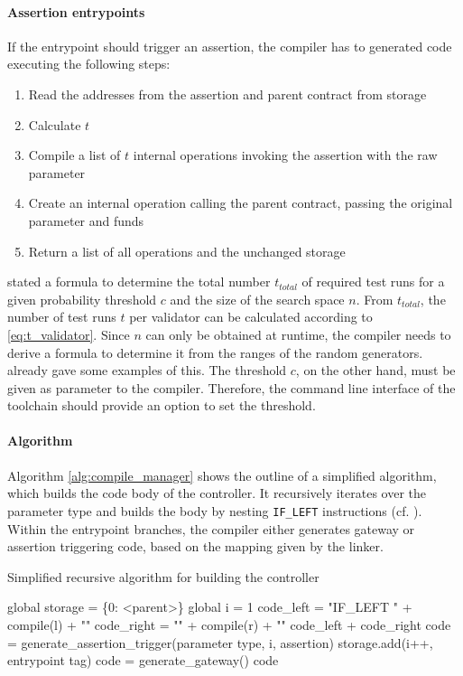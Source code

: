 \paragraph{Assertion entrypoints}
If the entrypoint should trigger an assertion, the compiler has to generated code executing the following steps:
\begin{enumerate}
\itemsep-0.5em
\item Read the addresses from the assertion and parent contract from storage
\item Calculate $t$
\item Compile a list of $t$ internal operations invoking the assertion with the raw parameter
\item Create an internal operation calling the parent contract, passing the original parameter and funds
\item Return a list of all operations and the unchanged storage
\end{enumerate}
 stated a formula to determine the total number $t_{total}$ of required test runs for a given probability threshold $c$ and the size of the search space $n$. From $t_{total}$, the number of test runs $t$ per validator can be calculated according to \eqref{eq:t_validator}. Since $n$ can only be obtained at runtime, the compiler needs to derive a formula to determine it from the ranges of the random generators.  already gave some examples of this. 
The threshold $c$, on the other hand, must be given as parameter to the compiler. Therefore, the command line interface of the toolchain should provide an option to set the threshold.

\paragraph{Algorithm}
Algorithm \ref{alg:compile_manager} shows the outline of a simplified algorithm, which builds the code body of the controller. It recursively iterates over the parameter type and builds the body by nesting \texttt{IF\_LEFT} instructions (cf. ). Within the entrypoint branches, the compiler either generates gateway or assertion triggering code, based on the mapping given by the linker.

\begin{algorithm}
\caption{Simplified recursive algorithm for building the controller}\label{alg:compile_manager}
	\begin{algorithmic}[1]
	\State global storage = \{0: <parent>\}
	\State global i = 1
	\State code\_left = "IF\_LEFT {" + compile(l) + "}"
	\State code\_right = "{" + compile(r) + "}"
	\State \Return code\_left + code\_right
	\Else
	\State code = generate\_assertion\_trigger(parameter type, i, assertion)
	\State storage.add(i++, entrypoint tag)
	\Else
	\State code = generate\_gateway()
	\EndIf
	\State \Return code
	\EndIf
	\EndFunction
	\end{algorithmic}
\end{algorithm}

